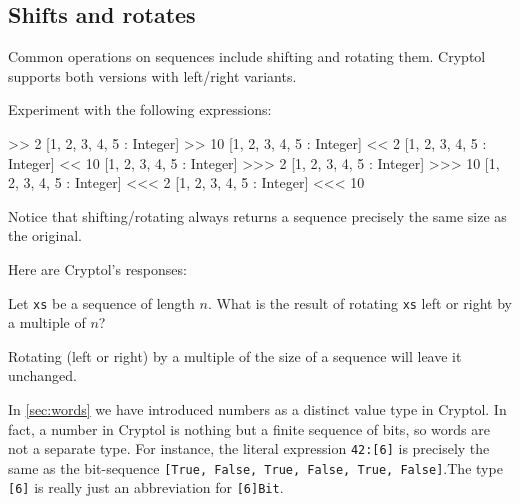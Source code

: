 \subsection{Shifts and rotates}
\label{sec:shifts-rotates}

Common operations on sequences include shifting and rotating them.
Cryptol supports both versions with left/right
variants.\indShiftLeft\indShiftRight\indRotLeft\indRotRight
\restartrepl
\begin{Exercise}\label{ex:seq:14}
Experiment with the following expressions:
\begin{replinVerb}
   [1, 2, 3, 4, 5 : Integer] >> 2
   [1, 2, 3, 4, 5 : Integer] >> 10
   [1, 2, 3, 4, 5 : Integer] << 2
   [1, 2, 3, 4, 5 : Integer] << 10
   [1, 2, 3, 4, 5 : Integer] >>> 2
   [1, 2, 3, 4, 5 : Integer] >>> 10
   [1, 2, 3, 4, 5 : Integer] <<< 2
   [1, 2, 3, 4, 5 : Integer] <<< 10
\end{replinVerb}
\noindent Notice that shifting/rotating always returns a sequence
precisely the same size as the original.
\end{Exercise}
\begin{Answer}
Here are Cryptol's responses:
\begin{reploutVerb}
  [0, 0, 1, 2, 3]
  [0, 0, 0, 0, 0]
  [3, 4, 5, 0, 0]
  [0, 0, 0, 0, 0]
  [4, 5, 1, 2, 3]
  [1, 2, 3, 4, 5]
  [3, 4, 5, 1, 2]
  [1, 2, 3, 4, 5]
\end{reploutVerb}
\end{Answer}
\begin{Exercise}\label{ex:seq:15}
  Let {\tt xs} be a sequence of length $n$. What is the result of
  rotating {\tt xs} left or right by a multiple of $n$?
\end{Exercise}
\begin{Answer}
  Rotating (left or right) by a multiple of the size of a sequence
  will leave it unchanged.
\end{Answer}


In \autoref{sec:words} we have introduced numbers as a distinct value
type in Cryptol. In fact, a number in Cryptol is nothing but a finite
sequence of bits, so words are not a separate type. For instance, the
literal expression \texttt{42:[6]} is precisely the same as the
bit-sequence \texttt{[True, False, True, False, True,
    False]}.\indTheWordType The type \texttt{[6]} is really just an
abbreviation for \texttt{[6]Bit}.

